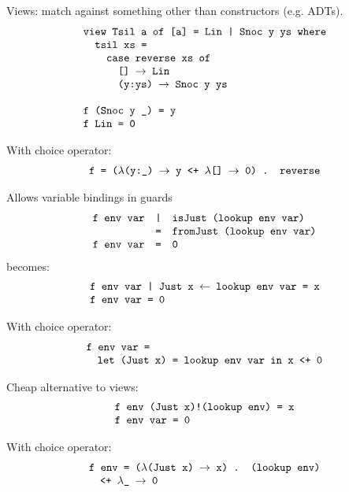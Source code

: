 \documentclass[leqno, fleqn]{foils}
\newcommand{\ve}[1]{\ensuremath{\text{\tt #1}}}
\newcommand{\ra}{\ensuremath{\rightarrow} }
\begin{document}

Views: match against something other than constructors (e.g. ADTs).
\[
\begin{array}{l}
\ve{view Tsil a of [a] = Lin | Snoc y ys where} \\
\ve{\quad tsil xs =} \\
\ve{\quad \quad case reverse xs of} \\
\ve{\quad \quad \quad [] \ra Lin} \\
\ve{\quad \quad \quad (y:ys) \ra Snoc y ys} \\
\\
\ve{f (Snoc y \_) = y} \\
\ve{f Lin = 0}
\end{array}
\]

With choice operator:
\[
\begin{array}{l}
\ve{f = ($\lambda$(y:\_) \ra y <+ $\lambda$[] \ra 0) . reverse}
\end{array}
\]



Allows variable bindings in guards
\[
\begin{array}{lll}
\ve{f env var} & \ve{|} & \ve{isJust (lookup env var)} \\
               & \ve{=} & \ve{fromJust (lookup env var)} \\
\ve{f env var} & \ve{=} & \ve{0}
\end{array}
\]
becomes:
\[
\begin{array}{l}
\ve{f env var | Just x $\leftarrow$ lookup env var = x} \\
\ve{f env var = 0}
\end{array}
\]

With choice operator:
\[
\begin{array}{l}
\ve{f env var = } \\
\quad \ve{let (Just x) = lookup env var in x <+ 0} \\
\end{array}
\]



Cheap alternative to views:
\[
\begin{array}{l}
\ve{f env (Just x)!(lookup env) = x} \\
\ve{f env var = 0}
\end{array}
\]

With choice operator:
\[
\begin{array}{l}
\ve{f env = ($\lambda$(Just x) \ra x) . (lookup env)} \\
\quad \ve{<+ $\lambda$\_ \ra 0}
\end{array}
\]
\end{document}
